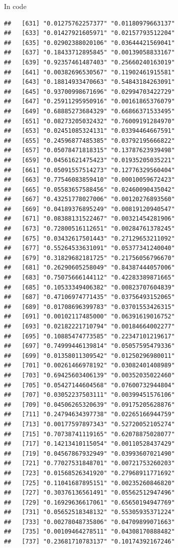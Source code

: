 \documentclass[ignorenonframetext,]{beamer}
\begin{document}
\begin{frame}[fragile]{In code}
\begin{verbatim}
##   [631] "0.01275762257377" "0.01180979663137"
##   [633] "0.01427921605971" "0.02157793512204"
##   [635] "0.02902388020106" "0.03644421569041"
##   [637] "0.18433712895845" "0.00139058833167"
##   [639] "0.92357461487403" "0.25660240163019"
##   [641] "0.00382696530567" "0.11902461915581"
##   [643] "0.18814933470663" "0.54843184263091"
##   [645] "0.93700998671696" "0.02994703422729"
##   [647] "0.25911295950916" "0.00161865376079"
##   [649] "0.68885273684329" "0.66866371533495"
##   [651] "0.08273205032432" "0.76009191284970"
##   [653] "0.02451085324131" "0.03394464667591"
##   [655] "0.24596877485385" "0.03792195666822"
##   [657] "0.05078471818315" "0.13787623939498"
##   [659] "0.04561621475423" "0.01935205035221"
##   [661] "0.05091557514273" "0.12776329560404"
##   [663] "0.77546083859410" "0.00010059672423"
##   [665] "0.05583657588456" "0.02460090435042"
##   [667] "0.43251778027006" "0.00120276893560"
##   [669] "0.04189376895249" "0.00819120940547"
##   [671] "0.08388131522467" "0.00321454281906"
##   [673] "0.72800516112651" "0.00284761378245"
##   [675] "0.03432617501443" "0.27129653211092"
##   [677] "0.55264533631091" "0.05377341240040"
##   [679] "0.31829682181725" "0.21756056796670"
##   [681] "0.26290605258049" "0.84387444057006"
##   [683] "0.75075666144112" "0.42283389871665"
##   [685] "0.10533349406382" "0.00823707604839"
##   [687] "0.47106974771435" "0.03756493152065"
##   [689] "0.01708696399783" "0.03701553426315"
##   [691] "0.00102117485000" "0.06391619016752"
##   [693] "0.02182221710794" "0.00184664002277"
##   [695] "0.10885474773585" "0.22347101219617"
##   [697] "0.74999446139814" "0.05057595479336"
##   [699] "0.01358011309542" "0.01250296980011"
##   [701] "0.00261466978192" "0.03082401408989"
##   [703] "0.69425603406139" "0.00352035022460"
##   [705] "0.05427144604568" "0.07600732944804"
##   [707] "0.03052237503111" "0.00399451576106"
##   [709] "0.04506265320639" "0.09175205628876"
##   [711] "0.24794634397738" "0.02265166944759"
##   [713] "0.00177597897343" "0.52720052105274"
##   [715] "0.70738741119165" "0.62078875028077"
##   [717] "0.14213410115054" "0.00110528437429"
##   [719] "0.04567867932949" "0.03993607021490"
##   [721] "0.77027531848701" "0.00721753260203"
##   [723] "0.01568526341920" "0.27968911771692"
##   [725] "0.11041687895151" "0.00235260846820"
##   [727] "0.30376136561491" "0.05562512947496"
##   [729] "0.16929636617061" "0.65650194947769"
##   [731] "0.05652518348132" "0.55305935371224"
##   [733] "0.00278048735806" "0.04709899071663"
##   [735] "0.00109464278511" "0.04308170888482"
##   [737] "0.23681710783137" "0.10174392167246"

\end{verbatim}
\end{frame}
\end{document}
